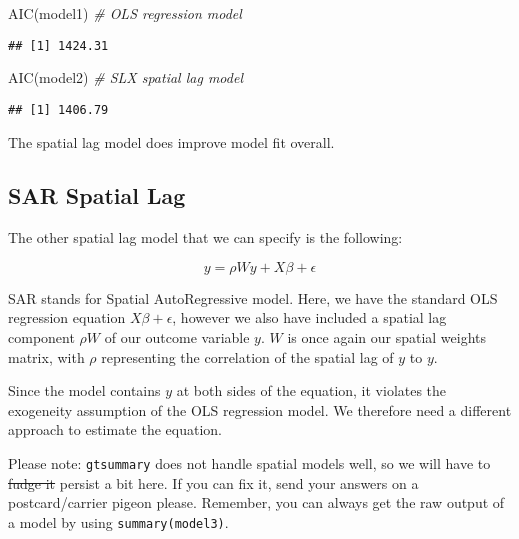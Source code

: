 \documentclass[
]{book}
\newenvironment{Shaded}{\begin{snugshade}}{\end{snugshade}}
\newcommand{\CommentTok}[1]{\textcolor[rgb]{0.56,0.35,0.01}{\textit{#1}}}
\newcommand{\FunctionTok}[1]{\textcolor[rgb]{0.00,0.00,0.00}{#1}}
\newcommand{\NormalTok}[1]{#1}
\begin{document}
\begin{Shaded}
\begin{Highlighting}[]
\FunctionTok{AIC}\NormalTok{(model1) }\CommentTok{\# OLS regression model}
\end{Highlighting}
\end{Shaded}

\begin{verbatim}
## [1] 1424.31
\end{verbatim}

\begin{Shaded}
\begin{Highlighting}[]
\FunctionTok{AIC}\NormalTok{(model2) }\CommentTok{\# SLX spatial lag model}
\end{Highlighting}
\end{Shaded}

\begin{verbatim}
## [1] 1406.79
\end{verbatim}

The spatial lag model does improve model fit overall.

\hypertarget{sar-spatial-lag}{%
\subsection{SAR Spatial Lag}\label{sar-spatial-lag}}

The other spatial lag model that we can specify is the following:

\[
y = \rho Wy + X\beta + \epsilon
\]

SAR stands for Spatial AutoRegressive model. Here, we have the standard OLS regression equation \(X\beta + \epsilon\), however we also have included a spatial lag component \(\rho W\) of our outcome variable \(y\). \(W\) is once again our spatial weights matrix, with \(\rho\) representing the correlation of the spatial lag of \(y\) to \(y\).

Since the model contains \(y\) at both sides of the equation, it violates the exogeneity assumption of the OLS regression model. We therefore need a different approach to estimate the equation.

Please note: \texttt{gtsummary} does not handle spatial models well, so we will have to \sout{fudge it} persist a bit here. If you can fix it, send your answers on a postcard/carrier pigeon please. Remember, you can always get the raw output of a model by using \texttt{summary(model3)}.
\end{document}
